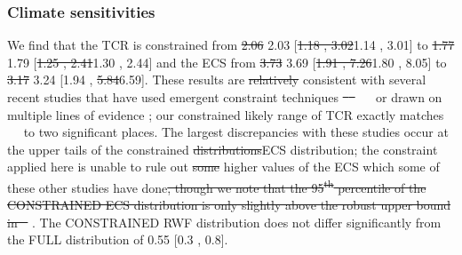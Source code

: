 \documentclass[gmd, manuscript]{copernicus}
\providecommand{\DIFadd}[1]{{\protect\color{blue}#1}} %
\providecommand{\DIFdel}[1]{{\protect\color{red}\sout{#1}}}                      %
\providecommand{\DIFaddbegin}{} %
\providecommand{\DIFaddend}{} %
\providecommand{\DIFdelbegin}{} %
\providecommand{\DIFdelend}{} %
\begin{document}
\subsubsection{Climate sensitivities}
We find that the TCR is constrained from \DIFdelbegin \DIFdel{2.06 }\DIFdelend \DIFaddbegin \DIFadd{2.03 }\DIFaddend [\DIFdelbegin \DIFdel{1.18 , 3.02}\DIFdelend \DIFaddbegin \DIFadd{1.14 , 3.01}\DIFaddend ] to \DIFdelbegin \DIFdel{1.77 }\DIFdelend \DIFaddbegin \DIFadd{1.79 }\DIFaddend [\DIFdelbegin \DIFdel{1.25 , 2.41}\DIFdelend \DIFaddbegin \DIFadd{1.30 , 2.44}\DIFaddend ] and the ECS from \DIFdelbegin \DIFdel{3.73 }\DIFdelend \DIFaddbegin \DIFadd{3.69 }\DIFaddend [\DIFdelbegin \DIFdel{1.91 , 7.26}\DIFdelend \DIFaddbegin \DIFadd{1.80 , 8.05}\DIFaddend ] to \DIFdelbegin \DIFdel{3.17 }\DIFdelend \DIFaddbegin \DIFadd{3.24 }\DIFaddend [1.94 , \DIFdelbegin \DIFdel{5.84}\DIFdelend \DIFaddbegin \DIFadd{6.59}\DIFaddend ]. These results are \DIFdelbegin \DIFdel{relatively }\DIFdelend consistent with several recent studies that have used emergent constraint techniques \DIFdelbegin \DIFdel{\mbox{%
\citep{Nijsse2020,Jimenez-de-la-Cuesta2019,Tokarska2020a} }\hspace{0pt}%
}\DIFdelend \DIFaddbegin \DIFadd{\mbox{%
\citep[Figure \ref{fig:clim_sens_comp}]{Nijsse2020,Jimenez-de-la-Cuesta2019,Tokarska2020a,Brunner2020,Ribes2021} }\hspace{0pt}%
}\DIFaddend or drawn on multiple lines of evidence \citep{Sherwood2020}\DIFaddbegin \DIFadd{; our constrained likely range of TCR exactly matches \mbox{%
\citeauthor{Sherwood2020} }\hspace{0pt}%
to two significant places}\DIFaddend . The largest discrepancies with these studies occur at the upper tails of the constrained \DIFdelbegin \DIFdel{distributions}\DIFdelend \DIFaddbegin \DIFadd{ECS distribution}\DIFaddend ; the constraint applied here is unable to rule out \DIFdelbegin \DIFdel{some }\DIFdelend higher values of the ECS which \DIFaddbegin \DIFadd{some of }\DIFaddend these other studies have done\DIFdelbegin \DIFdel{, though we note that the 95\textsuperscript{th} percentile of the CONSTRAINED ECS distribution is only slightly above the robust upper bound in \mbox{%
\cite{Sherwood2020}}\hspace{0pt}%
}\DIFdelend . The CONSTRAINED RWF distribution does not differ significantly from the FULL distribution of 0.55 [0.3 , 0.8].
\DIFdelbegin %
\end{document}
